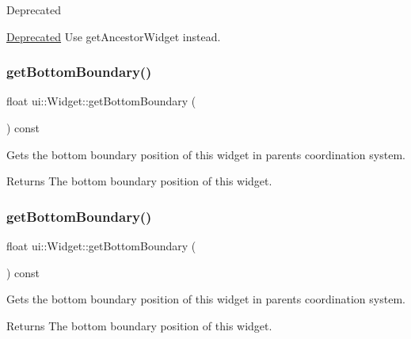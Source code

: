 \begin{DoxyRefDesc}{Deprecated}
\item[\hyperlink{deprecated__deprecated000416}{Deprecated}]Use get\+Ancestor\+Widget instead. \end{DoxyRefDesc}
\mbox{\label{classui_1_1Widget_a70fffbbaaff8cfcccb305e3b90bb85e6}} 
\subsubsection{\texorpdfstring{get\+Bottom\+Boundary()}{getBottomBoundary()}\hspace{0.1cm}{\footnotesize\ttfamily [1/2]}}
{\footnotesize\ttfamily float ui\+::\+Widget\+::get\+Bottom\+Boundary (\begin{DoxyParamCaption}{ }\end{DoxyParamCaption}) const}

Gets the bottom boundary position of this widget in parent\textquotesingle{}s coordination system. \begin{DoxyReturn}{Returns}
The bottom boundary position of this widget. 
\end{DoxyReturn}
\mbox{\label{classui_1_1Widget_a70fffbbaaff8cfcccb305e3b90bb85e6}} 
\subsubsection{\texorpdfstring{get\+Bottom\+Boundary()}{getBottomBoundary()}\hspace{0.1cm}{\footnotesize\ttfamily [2/2]}}
{\footnotesize\ttfamily float ui\+::\+Widget\+::get\+Bottom\+Boundary (\begin{DoxyParamCaption}{ }\end{DoxyParamCaption}) const}

Gets the bottom boundary position of this widget in parent\textquotesingle{}s coordination system. \begin{DoxyReturn}{Returns}
The bottom boundary position of this widget. 
\end{DoxyReturn}
\mbox{\label{classui_1_1Widget_a91d67290067178a0a7534edb06756495}} 
